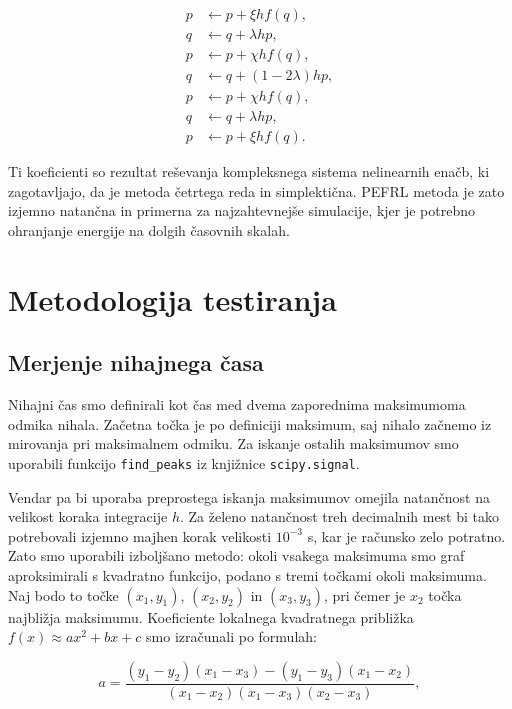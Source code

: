 \documentclass[12pt,a4paper]{article}
\begin{document}
\begin{align}
p &\leftarrow p + \xi h f(q), \\
q &\leftarrow q + \lambda h p, \\
p &\leftarrow p + \chi h f(q), \\
q &\leftarrow q + (1-2\lambda) h p, \\
p &\leftarrow p + \chi h f(q), \\
q &\leftarrow q + \lambda h p, \\
p &\leftarrow p + \xi h f(q).
\end{align}

Ti koeficienti so rezultat reševanja kompleksnega sistema nelinearnih enačb, ki zagotavljajo, da je metoda četrtega reda in simplektična. PEFRL metoda je zato izjemno natančna in primerna za najzahtevnejše simulacije, kjer je potrebno ohranjanje energije na dolgih časovnih skalah.

\section{Metodologija testiranja}

\subsection{Merjenje nihajnega časa}

Nihajni čas smo definirali kot čas med dvema zaporednima maksimumoma odmika nihala. Začetna točka je po definiciji maksimum, saj nihalo začnemo iz mirovanja pri maksimalnem odmiku. Za iskanje ostalih maksimumov smo uporabili funkcijo \texttt{find\_peaks} iz knjižnice \texttt{scipy.signal}.

Vendar pa bi uporaba preprostega iskanja maksimumov omejila natančnost na velikost koraka integracije $h$. Za želeno natančnost treh decimalnih mest bi tako potrebovali izjemno majhen korak velikosti $10^{-3}$ s, kar je računsko zelo potratno. Zato smo uporabili izboljšano metodo: okoli vsakega maksimuma smo graf aproksimirali s kvadratno funkcijo, podano s tremi točkami okoli maksimuma. Naj bodo to točke $(x_1, y_1)$, $(x_2, y_2)$ in $(x_3, y_3)$, pri čemer je $x_2$ točka najbližja maksimumu. Koeficiente lokalnega kvadratnega približka $f(x) \approx ax^2 + bx + c$ smo izračunali po formulah:

\begin{equation}
a = \frac{(y_1-y_2)(x_1-x_3) - (y_1-y_3)(x_1-x_2)}{(x_1-x_2)(x_1-x_3)(x_2-x_3)},
\end{equation}
\end{document}

